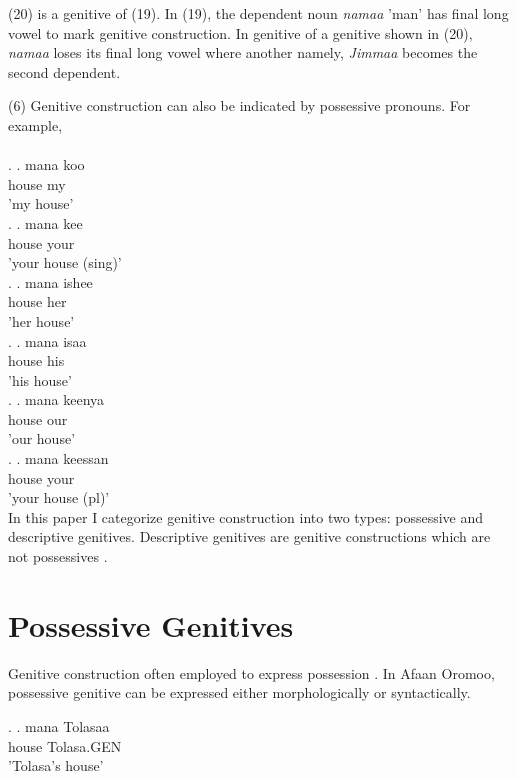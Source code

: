 \documentclass[11pt,a4paper]{article}
\begin{document}
	(20) is a genitive of (19). In (19), the dependent noun \emph{namaa} 'man' has final long vowel to mark genitive construction. In genitive of a genitive shown in (20), \emph{namaa} loses its final long vowel where another namely, \emph{Jimmaa} becomes the second dependent.
	
	(6) Genitive construction can also be indicated by possessive pronouns. For example,\\
	\\
	\ex.
	\ag.
	mana koo \\
	house my \\
	'my house'\\
	
	\ex.
	\ag.
	mana kee \\
	house your\\
	'your house (sing)'\\
	
	\ex.
	\ag.
	mana ishee \\
	house her\\
	'her house'\\
	
	\ex.
	\ag.
	mana isaa \\
	house his\\
	'his house'\\
	
	\ex.
	\ag.
	mana keenya \\
	house our\\
	'our house'\\
	
	\ex.
	\ag.
	mana keessan \\
	house your\\
	'your house (pl)'\\
	
	
	 
	
	In this paper I categorize genitive construction into two types: possessive and descriptive genitives. Descriptive genitives are genitive constructions which are not possessives \cite{rosenbach2006descriptive}.
	
	\section{Possessive Genitives}
	
	Genitive construction often employed to express possession \cite[68]{greenlee1950genitive}.
	In Afaan Oromoo, possessive genitive can be expressed either morphologically or syntactically. 
	
	\ex.
	\ag.
	mana Tolasaa\\
	house Tolasa.GEN\\
	'Tolasa's house'
	
\end{document}
